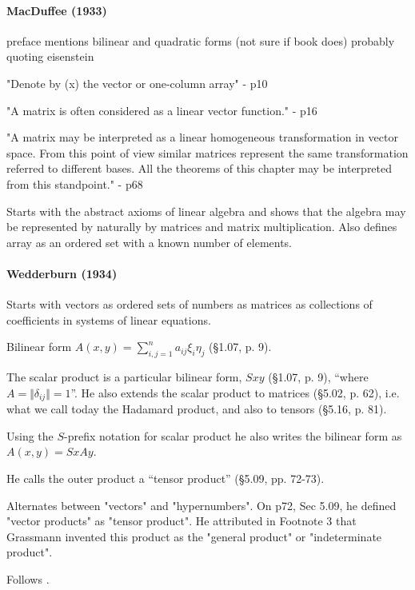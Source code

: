 \paragraph{MacDuffee (1933)~\cite{MacDuffee1933}}

preface mentions bilinear and quadratic forms (not sure if book does)
probably quoting eisenstein

"Denote by (x) the vector or one-column array" - p10

"A matrix is often considered as a linear vector function." - p16

"A matrix may be interpreted as a linear homogeneous transformation in
vector space. From this point of view similar matrices represent the
same transformation referred to different bases. All the theorems of
this chapter may be interpreted from this standpoint." - p68

Starts with the abstract axioms of linear algebra and shows that the algebra may be represented by naturally by matrices and matrix multiplication. Also defines array as an ordered set with a known number of elements.

\paragraph{Wedderburn (1934)~\cite{Wedderburn1934}}

Starts with vectors as ordered sets of numbers as matrices as collections of coefficients in systems of linear equations.

Bilinear form $A(x, y) = \sum^n_{i,j=1} a_{ij} \xi_i \eta_j $ (\S 1.07, p. 9).

The scalar product is a particular bilinear form, $S x y$ (\S 1.07, p. 9), ``where $A = \Vert \delta_{ij} \Vert = 1$''. He also extends the scalar product to matrices (\S 5.02, p. 62), i.e. what we call today the Hadamard product, and also to tensors (\S 5.16, p. 81).

Using the $S$-prefix notation for scalar product he also writes the bilinear form as $A(x, y) = SxAy$.

He calls the outer product a ``tensor product'' (\S 5.09, pp. 72-73).

Alternates between "vectors"
and "hypernumbers". On p72, Sec 5.09, he defined "vector products" as
"tensor product". He attributed in Footnote 3 that Grassmann invented
this product as the "general product" or "indeterminate product".

Follows \cite{Scheffers1889}.




